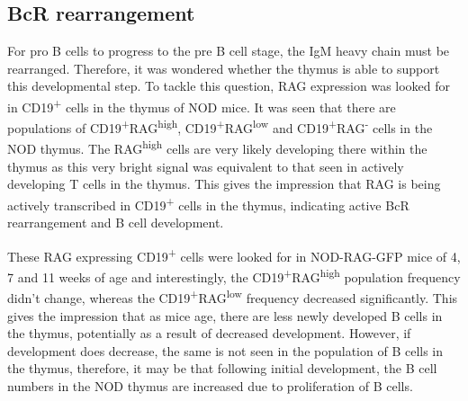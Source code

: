 


\subsection{BcR rearrangement}
For pro B cells to progress to the pre B cell stage, the IgM heavy chain must be rearranged.
Therefore, it was wondered whether the thymus is able to support this developmental step.
To tackle this question, RAG expression was looked for in CD19\textsuperscript{+} cells in the thymus of NOD mice.
It was seen that there are populations of CD19\textsuperscript{+}RAG\textsuperscript{high}, CD19\textsuperscript{+}RAG\textsuperscript{low} and CD19\textsuperscript{+}RAG\textsuperscript{-} cells in the NOD thymus.
The RAG\textsuperscript{high} cells are very likely developing there within the thymus as this very bright signal was equivalent to that seen in actively developing T cells in the thymus.
This gives the impression that RAG is being actively transcribed in CD19\textsuperscript{+} cells in the thymus, indicating active BcR rearrangement and B cell development.

These RAG expressing CD19\textsuperscript{+} cells were looked for in NOD-RAG-GFP mice of 4, 7 and 11 weeks of age and interestingly, the CD19\textsuperscript{+}RAG\textsuperscript{high} population frequency didn't change, whereas the CD19\textsuperscript{+}RAG\textsuperscript{low} frequency decreased significantly.
This gives the impression that as mice age, there are less newly developed B cells in the thymus, potentially as a result of decreased development.
However, if development does decrease, the same is not seen in the population of B cells in the thymus, therefore, it may be that following initial development, the B cell numbers in the NOD thymus are increased due to proliferation of B cells.

